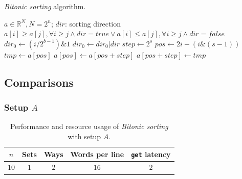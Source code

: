 \documentclass[11pt,a4paper,oneside]{memoir}
\begin{document}
\begin{algorithm}
	\caption{\emph{Bitonic sorting} algorithm.}\label{alg:bitonic}
	\begin{algorithmic}
		\Require $a \in \mathbb{R}^N, N = 2^n$; $dir$: sorting direction
		\Ensure $a[i] \geq a[j], \forall i \geq j \wedge dir = true \vee
			a[i] \leq a[j], \forall i \geq j \wedge dir = false$
						\State $dir_0 \gets
							(i/2^{b - 1}) \& 1$
						\State $dir_0 \gets dir_0 | dir$
						\State $step \gets 2^s$
						\State $pos \gets 2 i -
							(i \& (s - 1))$
							\State $tmp \gets a[pos]$
							\State $a[pos] \gets
								a[pos + step]$
							\State $a[pos + step]
								\gets tmp$
						\EndIf
					\EndFor
				\EndFor
			\EndFor
		\EndProcedure
	\end{algorithmic}
\end{algorithm}

\subsection{Comparisons}
\subsubsection{Setup $A$}
\begin{table}[!htb]
	\begin{center}
		\begin{tabular}{ccccc}
			\hline
			\rowcolor{gray!50}
			\textbf{$n$} & \textbf{Sets} & \textbf{Ways} &
			\textbf{Words per line} & \textbf{\texttt{get} latency} \\
			\hline
			$10$ & $1$ & $2$ & $16$ & $2$ \\
			\hline
		\end{tabular}
	\end{center}
	\caption{Performance and resource usage of \emph{Bitonic sorting}
	with setup $A$.}
	\label{tab:bitonic_setup_a}
\end{table}
\end{document}
